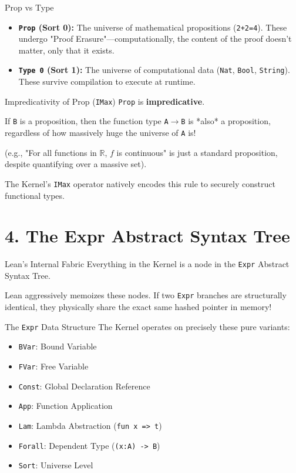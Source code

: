 \documentclass[10pt,aspectratio=169]{beamer}
\begin{document}
\begin{frame}[fragile]{Prop vs Type}
    \begin{itemize}
        \item \textbf{\texttt{Prop} (Sort 0):} The universe of mathematical propositions (\verb|2+2=4|). These undergo "Proof Erasure"—computationally, the content of the proof doesn't matter, only that it exists.
        \item \textbf{\texttt{Type 0} (Sort 1):} The universe of computational data (\verb|Nat|, \verb|Bool|, \verb|String|). These survive compilation to execute at runtime.
    \end{itemize}
\end{frame}

\begin{frame}[fragile]{Impredicativity of Prop (\texttt{IMax})}
    \verb|Prop| is \textbf{impredicative}. 
    
    If \verb|B| is a proposition, then the function type \verb|A|\(\rightarrow\)\verb|B| is *also* a proposition, regardless of how massively huge the universe of \verb|A| is! 
    
    (e.g., "For all functions in $\mathbb{R}$, $f$ is continuous" is just a standard proposition, despite quantifying over a massive set).
    
    The Kernel's \verb|IMax| operator natively encodes this rule to securely construct functional types.
\end{frame}

\section{4. The Expr Abstract Syntax Tree}

\begin{frame}[fragile]{Lean's Internal Fabric}
    Everything in the Kernel is a node in the \verb|Expr| Abstract Syntax Tree.
    
    Lean aggressively memoizes these nodes. If two \verb|Expr| branches are structurally identical, they physically share the exact same hashed pointer in memory!
\end{frame}

\begin{frame}[fragile]{The \texttt{Expr} Data Structure}
    The Kernel operates on precisely these pure variants:
    \begin{itemize}
        \item \verb|BVar|: Bound Variable
        \item \verb|FVar|: Free Variable
        \item \verb|Const|: Global Declaration Reference
        \item \verb|App|: Function Application
        \item \verb|Lam|: Lambda Abstraction (\verb|fun x => t|)
        \item \verb|Forall|: Dependent Type (\verb|(x:A) -> B|)
        \item \verb|Sort|: Universe Level
    \end{itemize}
\end{frame}
\end{document}
